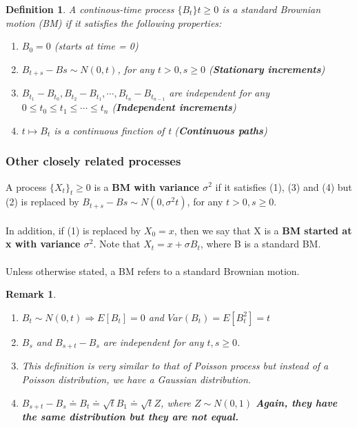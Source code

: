 \documentclass[12pt]{article}
\newtheorem{definition}{Definition}
\newtheorem*{remark}{Remark}
\begin{document}
\begin{definition}
    A continous-time process $\{B_t\}t\geq0$ is a standard Brownian motion (BM) if it satisfies the following properties:
    \begin{enumerate}
        \item $B_0 = 0$ (starts at time = 0)
        \item $B_{t+s}-B{s} \sim N(0,t)$, for any $t > 0, s \geq 0$ (\textbf{Stationary increments})
        \item $B_{t_1}-B_{t_0}, B_{t_2}-B_{t_1}, \cdots, B_{t_n}-B_{t_{n-1}}$ are independent for any $0 \leq t_0 \leq t_1 \leq \cdots \leq t_n$ (\textbf{Independent increments})
        \item $t \mapsto B_t$ is a continuous finction of t (\textbf{Continuous paths})
    \end{enumerate}
\end{definition}

\subsubsection{Other closely related processes}

A process $\{X_t\}_t\geq0$ is a \textbf{BM with variance $\sigma ^2$} if it satisfies (1), (3) and (4) but (2) is replaced by $B_{t+s}-B{s} \sim N(0,\sigma ^2t)$, for any $t > 0, s \geq 0$.
\\
\\In addition, if (1) is replaced by $X_0 = x$, then we say that X is a \textbf{BM started at x with variance $\sigma^2$}. Note that $X_t = x + \sigma B_t$, where B is a standard BM.
\\
\\Unless otherwise stated, a BM refers to a standard Brownian motion.

\begin{remark}
    \begin{enumerate}
        \item $B_t \sim N(0,t) \Rightarrow E[B_t] = 0$ and $Var(B_t) = E[B_t^2] = t$
        \item $B_s$ and $B_{s+t} - B_{s}$ are independent for any $t, s \geq 0$.
        \item This definition is very similar to that of Poisson process but instead of a Poisson distribution, we have a Gaussian distribution.
        \item $B_{s+t} - B_{s} \doteq B_t \doteq \sqrt{t}B_1 \doteq \sqrt{t}Z$, where $Z \sim N(0,1)$ \textbf{Again, they have the same distribution but they are not equal.}
    \end{enumerate}
\end{remark}
\end{document}
